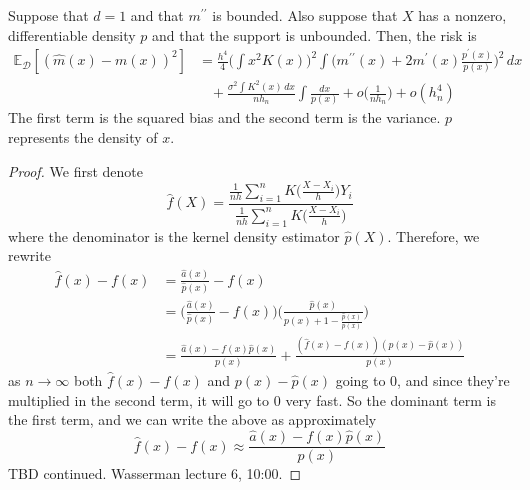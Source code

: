   \begin{theorem}
    \label{thm:bias-variance-tradeoff-of-kernel-regression}
    Suppose that $d = 1$ and that $m^{\prime\prime}$ is bounded. Also suppose that $X$ has a nonzero, differentiable density $p$ and that the support is unbounded. Then, the risk is 
    \begin{align}
      \mathbb{E}_{\mathcal{D}} \left[ (\hat{m}(x) - m(x))^2 \right] & = \frac{h^4}{4} \bigg( \int x^2 K(x) \bigg)^2 \int \bigg( m^{\prime\prime} (x) + 2m^\prime (x) \frac{p^\prime (x)}{p(x)} \bigg)^2 \,dx \\
          & \;\;\; + \frac{\sigma^2 \int K^2(x)\,dx} {n h_n} \int \frac{dx}{p(x)} + o \bigg( \frac{1}{n h_n} \bigg) + o(h_n^4) 
    \end{align}
    The first term is the squared bias and the second term is the variance. $p$ represents the density of $x$. 
  \end{theorem}
  \begin{proof}
    We first denote 
    \begin{equation}
      \hat{f}(X) = \frac{\frac{1}{nh} \sum_{i=1}^n K \bigg( \frac{X - X_i}{h} \bigg) Y_i}{\frac{1}{nh} \sum_{i=1}^n K \bigg( \frac{X - X_i}{h} \bigg)} 
    \end{equation}
    where the denominator is the kernel density estimator $\hat{p}(X)$. Therefore, we rewrite
    \begin{align}
      \hat{f} (x) - f(x) & = \frac{\hat{a}(x)}{\hat{p}(x)} - f(x) \\
                         & = \bigg( \frac{\hat{a}(x)}{\hat{p}(x)} - f(x) \bigg) \bigg( \frac{\hat{p}(x)}{p(x) + 1 - \frac{\hat{p}(x)}{p(x)}} \bigg) \\
                         & = \frac{\hat{a}(x) - f(x) \hat{p}(x)}{p(x)} + \frac{(\hat{f}(x) - f(x)) (p(x) - \hat{p}(x))}{p(x)}
    \end{align}
    as $n \rightarrow \infty$ both $\hat{f}(x) - f(x)$ and $p(x) - \hat{p}(x)$ going to $0$, and since they're multiplied in the second term, it will go to $0$ very fast. So the dominant term is the first term, and we can write the above as approximately 
    \begin{equation}
      \hat{f}(x) - f(x) \approx  \frac{\hat{a}(x) - f(x) \hat{p}(x)}{p(x)}
    \end{equation}
    TBD continued. Wasserman lecture 6, 10:00. 
  \end{proof}

